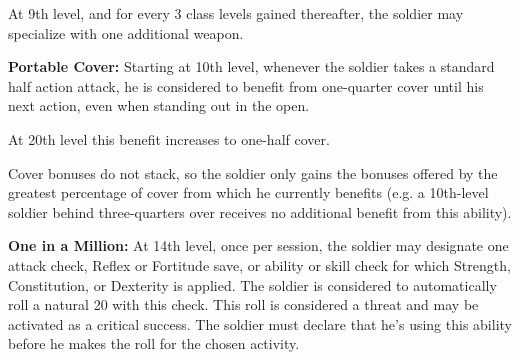At 9th level, and for every 3 class levels gained thereafter, the soldier may specialize with one additional weapon.

\textbf{Portable Cover:} Starting at 10th level, whenever the soldier takes a standard half action attack, he is considered to benefit from one-quarter cover until his next action, even when standing out in the open.

At 20th level this benefit increases to one-half cover.

Cover bonuses do not stack, so the soldier only gains the bonuses offered by the greatest percentage of cover from which he currently benefits (e.g. a 10th-level soldier behind three-quarters over receives no additional benefit from this ability).

\textbf{One in a Million:} At 14th level, once per session, the soldier may designate one attack check, Reflex or Fortitude save, or ability or skill check for which Strength, Constitution, or Dexterity is applied. The soldier is considered to automatically roll a natural 20 with this check. This roll is considered a threat and may be activated as a critical success. The soldier must declare that he's using this ability before he makes the roll for the chosen activity.
